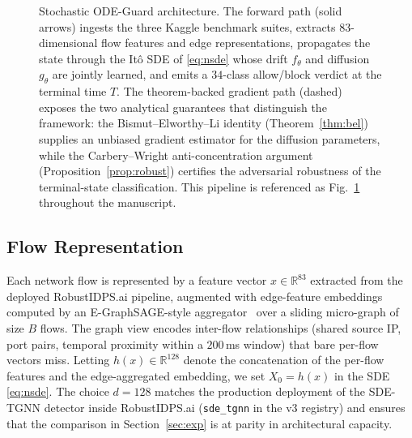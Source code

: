 \documentclass[journal,10pt]{IEEEtran}
\theoremstyle{definition}
\theoremstyle{remark}
\newcommand{\Real}{\mathbb{R}}
\begin{document}
\begin{figure}[t]
\caption{Stochastic ODE-Guard architecture. The forward path
(solid arrows) ingests the three Kaggle benchmark suites, extracts
$83$-dimensional flow features and edge representations, propagates
the state through the It\^o SDE of \eqref{eq:nsde} whose drift
$f_\theta$ and diffusion $g_\theta$ are jointly learned, and emits a
$34$-class allow/block verdict at the terminal time $T$. The
theorem-backed gradient path (dashed) exposes the two analytical
guarantees that distinguish the framework: the Bismut--Elworthy--Li
identity (Theorem~\ref{thm:bel}) supplies an unbiased gradient
estimator for the diffusion parameters, while the Carbery--Wright
anti-concentration argument (Proposition~\ref{prop:robust})
certifies the adversarial robustness of the terminal-state
classification. This pipeline is referenced as Fig.~\ref{fig:architecture}
throughout the manuscript.}
\label{fig:architecture}
\end{figure}

\subsection{Flow Representation}\label{subsec:flowrep}
Each network flow is represented by a feature vector
$x\in\Real^{83}$ extracted from the deployed RobustIDPS.ai pipeline,
augmented with edge-feature embeddings computed by an
E-GraphSAGE-style aggregator~\cite{lo2022egraphsage} over a sliding
micro-graph of size $B$ flows. The graph view encodes inter-flow
relationships (shared source IP, port pairs, temporal proximity within
a $200$\,ms window) that bare per-flow vectors miss. Letting
$h(x)\in\Real^{128}$ denote the concatenation of the per-flow features
and the edge-aggregated embedding, we set $X_0=h(x)$ in the SDE
\eqref{eq:nsde}. The choice $d=128$ matches the production deployment
of the SDE-TGNN detector inside RobustIDPS.ai
(\texttt{sde\_tgnn} in the v3 registry) and ensures that the
comparison in Section~\ref{sec:exp} is at parity in architectural
capacity.
\end{document}
